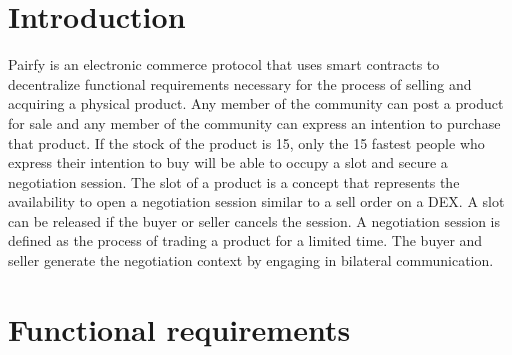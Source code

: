 \documentclass[12pt]{article}
\begin{document}
\maketitle

\renewcommand*\abstractname{\textbf{}\hfill}


\section{Introduction}

Pairfy is an electronic commerce protocol that uses smart contracts to decentralize functional requirements necessary for the process of selling and acquiring a physical product.
Any member of the community can post a product for sale and any member of the community can express an intention to purchase that product.
If the stock of the product is 15, only the 15 fastest people who express their intention to buy will be able to occupy a slot and secure a negotiation session.
The slot of a product is a concept that represents the availability to open a negotiation session similar to a sell order on a DEX. A slot can be released if the buyer or seller cancels the session.
A negotiation session is defined as the process of trading a product for a limited time. The buyer and seller generate the negotiation context by engaging in bilateral communication.



\section{ Functional requirements }
\end{document}
